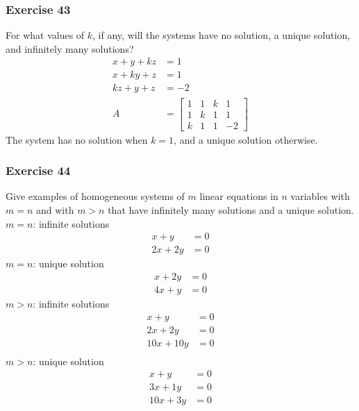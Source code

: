 \documentclass{math}
\begin{document}
\subsubsection*{Exercise 43}
For what values of \( k \), if any, will the systems have no solution, a unique
solution, and infinitely many solutions?
\begin{align*}
  x+y+kz &= 1 \\
  x+ky+z &= 1 \\
  kz+y+z &= -2 \\
  A &= \begin{bmatrix}
    1 & 1 & k & 1 \\
    1 & k & 1 & 1 \\
    k & 1 & 1 & -2
  \end{bmatrix}
\end{align*}
The system has no solution when \( k = 1 \), and a unique solution otherwise.

\subsubsection*{Exercise 44}
Give examples of homogeneous systems of \( m \) linear equations in \( n \)
variables with \( m = n \) and with \( m > n \) that have infinitely many
solutions and a unique solution. \\
\( m = n \): infinite solutions
\begin{align*}
  x+y &= 0 \\
  2x+2y &= 0
\end{align*}
\( m = n \): unique solution
\begin{align*}
  x+2y &= 0 \\
  4x+y &= 0
\end{align*}
\( m > n \): infinite solutions
\begin{align*}
  x+y &= 0 \\
  2x+2y &= 0 \\
  10x+10y &= 0 \\
\end{align*}
\( m > n \): unique solution
\begin{align*}
  x+y &= 0 \\
  3x+1y &= 0 \\
  10x+3y &= 0 \\
\end{align*}
\end{document}

